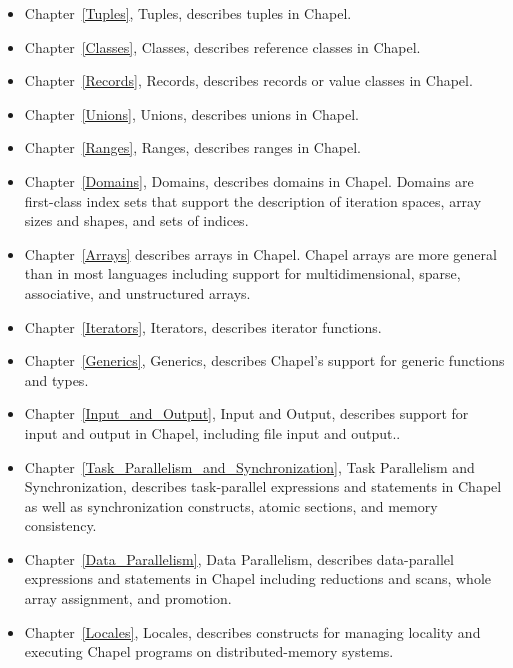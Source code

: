 \begin{itemize}
\item
Chapter~\ref{Tuples}, Tuples, describes tuples in Chapel.

\item
Chapter~\ref{Classes}, Classes, describes reference classes in Chapel.

\item
Chapter~\ref{Records}, Records, describes records or value classes in
Chapel.

\item
Chapter~\ref{Unions}, Unions, describes unions in Chapel.

\item
Chapter~\ref{Ranges}, Ranges, describes ranges in Chapel.

\item
Chapter~\ref{Domains}, Domains, describes domains in Chapel.  Domains are
first-class index sets that support the description of iteration
spaces, array sizes and shapes, and sets of indices.

\item
Chapter~\ref{Arrays} describes arrays in Chapel.  Chapel arrays are
more general than in most languages including support for
multidimensional, sparse, associative, and unstructured arrays.

\item
Chapter~\ref{Iterators}, Iterators, describes iterator functions.

\item
Chapter~\ref{Generics}, Generics, describes Chapel's support for
generic functions and types.

\item
Chapter~\ref{Input_and_Output}, Input and Output, describes support
for input and output in Chapel, including file input and output..

\item
Chapter~\ref{Task_Parallelism_and_Synchronization}, Task Parallelism
and Synchronization, describes task-parallel expressions and
statements in Chapel as well as synchronization constructs, atomic
sections, and memory consistency.

\item
Chapter~\ref{Data_Parallelism}, Data Parallelism, describes
data-parallel expressions and statements in Chapel including
reductions and scans, whole array assignment, and promotion.

\item
Chapter~\ref{Locales}, Locales, describes constructs for managing
locality and executing Chapel programs on distributed-memory systems.


\end{itemize}
